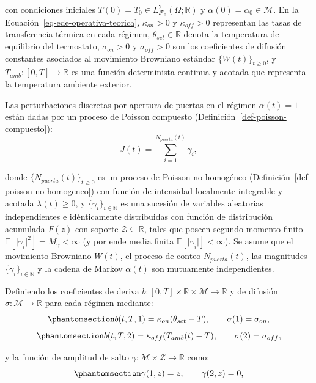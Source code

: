 \documentclass[
  spanish,
  us-letterpaper,
]{scrreprt}
\numberwithin{equation}{section}
\theoremstyle{plain}
\theoremstyle{plain}
\theoremstyle{definition}
\theoremstyle{plain}
\theoremstyle{remark}
\begin{document}
con condiciones iniciales
\(T(0) = T_0 \in L^2_{\mathcal{F}_0}(\Omega; \mathbb{R})\) y
\(\alpha(0) = \alpha_0 \in \mathcal{M}\). En la
Ecuación~\ref{eq-ede-operativa-teorica}, \(\kappa_{on} > 0\) y
\(\kappa_{off} > 0\) representan las tasas de transferencia térmica en
cada régimen, \(\theta_{set} \in \mathbb{R}\) denota la temperatura de
equilibrio del termostato, \(\sigma_{on} > 0\) y \(\sigma_{off} > 0\)
son los coeficientes de difusión constantes asociados al movimiento
Browniano estándar \(\{W(t)\}_{t \ge 0}\), y
\(T_{amb}: [0, T] \to \mathbb{R}\) es una función determinista continua
y acotada que representa la temperatura ambiente exterior.

Las perturbaciones discretas por apertura de puertas en el régimen
\(\alpha(t) = 1\) están dadas por un proceso de Poisson compuesto
(Definición~\ref{def-poisson-compuesto}): \[
J(t) = \sum_{i=1}^{N_{puerta}(t)} \gamma_i,
\]

donde \(\{N_{puerta}(t)\}_{t \ge 0}\) es un proceso de Poisson no
homogéneo (Definición~\ref{def-poisson-no-homogeneo}) con función de
intensidad localmente integrable y acotada \(\lambda(t) \ge 0\), y
\(\{\gamma_i\}_{i \in \mathbb{N}}\) es una sucesión de variables
aleatorias independientes e idénticamente distribuidas con función de
distribución acumulada \(F(z)\) con soporte
\(\mathcal{Z} \subseteq \mathbb{R}\), tales que poseen segundo momento
finito \(\mathbb{E}[\vert \gamma_i \vert^2] = M_\gamma < \infty\) (y por
ende media finita \(\mathbb{E}[\vert \gamma_i \vert] < \infty\)). Se
asume que el movimiento Browniano \(W(t)\), el proceso de conteo
\(N_{puerta}(t)\), las magnitudes \(\{\gamma_i\}_{i \in \mathbb{N}}\) y
la cadena de Markov \(\alpha(t)\) son mutuamente independientes.

Definiendo los coeficientes de deriva
\(b: [0, T] \times \mathbb{R} \times \mathcal{M} \to \mathbb{R}\) y de
difusión \(\sigma: \mathcal{M} \to \mathbb{R}\) para cada régimen
mediante: \begin{equation}\phantomsection\label{eq-coeficientes-on}{
b(t, T, 1) = \kappa_{on}(\theta_{set} - T), \qquad \sigma(1) = \sigma_{on},
}\end{equation}
\begin{equation}\phantomsection\label{eq-coeficientes-off}{
b(t, T, 2) = \kappa_{off}(T_{amb}(t) - T), \qquad \sigma(2) = \sigma_{off},
}\end{equation}

y la función de amplitud de salto
\(\gamma: \mathcal{M} \times \mathcal{Z} \to \mathbb{R}\) como:
\begin{equation}\phantomsection\label{eq-funcion-salto}{
\gamma(1, z) = z, \qquad \gamma(2, z) = 0,
}\end{equation}
\end{document}
